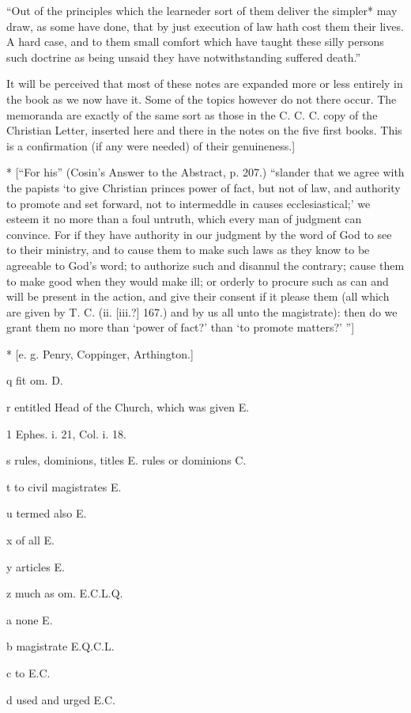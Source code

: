 “Out of the principles which the learneder sort of them deliver the simpler* may draw, as some have done, that by just execution of law hath cost them their lives. A hard case, and to them small comfort which have taught these silly persons such doctrine as being unsaid they have notwithstanding suffered death.”

It will be perceived that most of these notes are expanded more or less entirely in the book as we now have it. Some of the topics however do not there occur. The memoranda are exactly of the same sort as those in the C. C. C. copy of the Christian Letter, inserted here and there in the notes on the five first books. This is a confirmation (if any were needed) of their genuineness.]

*
[“For his” (Cosin’s Answer to the Abstract, p. 207.) “slander that we agree with the papists ‘to give Christian princes power of fact, but not of law, and authority to promote and set forward, not to intermeddle in causes ecclesiastical;’ we esteem it no more than a foul untruth, which every man of judgment can convince. For if they have authority in our judgment by the word of God to see to their ministry, and to cause them to make such laws as they know to be agreeable to God’s word; to authorize such and disannul the contrary; cause them to make good when they would make ill; or orderly to procure such as can and will be present in the action, and give their consent if it please them (all which are given by T. C. (ii. [iii.?] 167.) and by us all unto the magistrate): then do we grant them no more than ‘power of fact?’ than ‘to promote matters?’ ”]

*
[e. g. Penry, Coppinger, Arthington.]

q
fit om. D.

r
entitled Head of the Church, which was given E.

1
Ephes. i. 21, Col. i. 18.

s
rules, dominions, titles E. rules or dominions C.

t
to civil magistrates E.

u
termed also E.

x
of all E.

y
articles E.

z
much as om. E.C.L.Q.

a
none E.

b
magistrate E.Q.C.L.

c
to E.C.

d
used and urged E.C.

